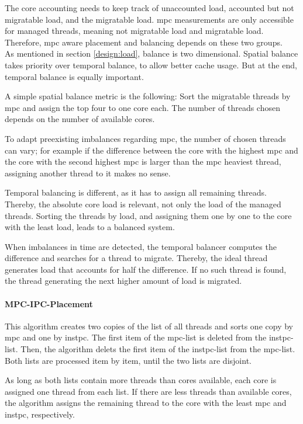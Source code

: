 The core accounting needs to keep track of unaccounted load, accounted but
not migratable load, and the migratable load.
\Gls{mpc} measurements are only accessible for managed threads, meaning not
migratable load and migratable load.
Therefore, \gls{mpc} aware placement and balancing depends on these two
groups.
\\

As mentioned in section \ref{design:load}, balance is two dimensional.
Spatial balance takes priority over temporal balance, to allow better cache usage.
But at the end, temporal balance is equally important.

A simple spatial balance metric is the following: Sort the migratable threads by
\gls{mpc} and assign the top four to one core each.
The number of threads chosen depends on the number of available cores.

To adapt preexisting imbalances regarding \gls{mpc},  the number of chosen
threads can vary; for example if the difference between the core with the
highest \gls{mpc} and the core with the second highest \gls{mpc} is larger than
the \gls{mpc} heaviest thread, assigning another thread to it makes no sense.

Temporal balancing is different, as it has to assign all remaining threads.
Thereby, the absolute core load is relevant, not only the load of the managed
threads.
Sorting the threads by load, and assigning them one by one to the
core with the least load, leads to a balanced system.

When imbalances in time are detected, the temporal balancer computes the difference
and searches for a thread to migrate.
Thereby, the ideal thread generates load that accounts for half the difference.
If no such thread is found, the thread generating the next higher amount of
load is migrated.


\paragraph{MPC-IPC-Placement}
This algorithm creates two copies of the list of all threads and sorts one copy
by \gls{mpc} and one by \gls{instpc}.
The first item of the \gls{mpc}-list is deleted from the
\gls{instpc}-list.
Then, the algorithm delets the first item of the  \gls{instpc}-list from the
\gls{mpc}-list.
Both lists are processed item by item, until the two lists are disjoint.

As long as both lists contain more threads than cores available, each core
is assigned one thread from each list.
If there are less threads than available cores, the algorithm assigns the
remaining thread to the core with the least \gls{mpc} and \gls{instpc},
respectively.

